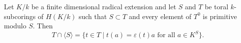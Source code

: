 Let $K/k$ be a finite dimensional radical extension and let $S$ and $T$ be toral $k$-subcorings of $H(K/k)$ such that $S \subset T$ and every element of $T^0$ is primitive modulo $S$. Then
$$T \cap \langle S \rangle = \{t \in T \mid t(a) = \varepsilon(t)a \text{ for all } a \in K^S\}.$$
